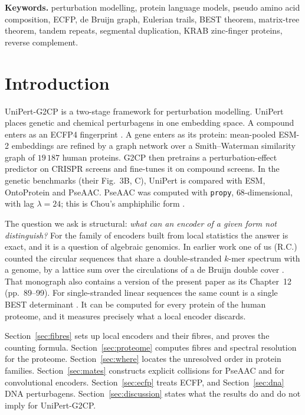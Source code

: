\documentclass[11pt]{article}
\theoremstyle{plain}
\theoremstyle{definition}
\theoremstyle{remark}
\begin{document}
\medskip
\noindent\textbf{Keywords.} perturbation modelling, protein language models, pseudo amino acid
composition, ECFP, de Bruijn graph, Eulerian trails, BEST theorem, matrix-tree theorem, tandem
repeats, segmental duplication, KRAB zinc-finger proteins, reverse complement.

\section{Introduction}\label{sec:intro}

UniPert-G2CP \cite{UniPert} is a two-stage framework for perturbation modelling. UniPert places genetic
and chemical perturbagens in one embedding space. A compound enters as an ECFP4 fingerprint
\cite{RH10}. A gene enters as its protein: mean-pooled ESM-2 embeddings \cite{ESM2} are refined by a
graph network over a Smith--Waterman similarity graph of $19\,187$ human proteins. G2CP then pretrains a
perturbation-effect predictor on CRISPR screens and fine-tunes it on compound screens. In the genetic
benchmarks (their Fig.~3B, C), UniPert is compared with ESM, OntoProtein and PseAAC. PseAAC was computed
with \texttt{propy}, $68$-dimensional, with lag $\lambda=24$; this is Chou's amphiphilic form
\cite{Chou01,Chou05}.

The question we ask is structural: \emph{what can an encoder of a given form not distinguish?} For
the family of encoders built from local statistics the answer is exact, and it is a question of
algebraic genomics. In earlier work one of us (R.C.) counted the circular sequences that share a
double-stranded $k$-mer spectrum with a genome, by a lattice sum over the circulations of a de Bruijn
double cover \cite[Chs.~7--9, pp.~49--73]{AG}. That monograph also contains a version of the present
paper as its Chapter~12 (pp.~89--99). For single-stranded linear sequences the
same count is a single BEST determinant \cite{BEST,SmithTutte}. It can be computed for every protein of the human proteome, and it measures
precisely what a local encoder discards.

Section~\ref{sec:fibres} sets up local encoders and their fibres, and proves the counting formula.
Section~\ref{sec:proteome} computes fibres and spectral resolution for the proteome.
Section~\ref{sec:where} locates the unresolved order in protein families. Section~\ref{sec:mates}
constructs explicit collisions for PseAAC and for convolutional encoders. Section~\ref{sec:ecfp}
treats ECFP, and Section~\ref{sec:dna} DNA perturbagens. Section~\ref{sec:discussion} states what
the results do and do not imply for UniPert-G2CP.
\end{document}
